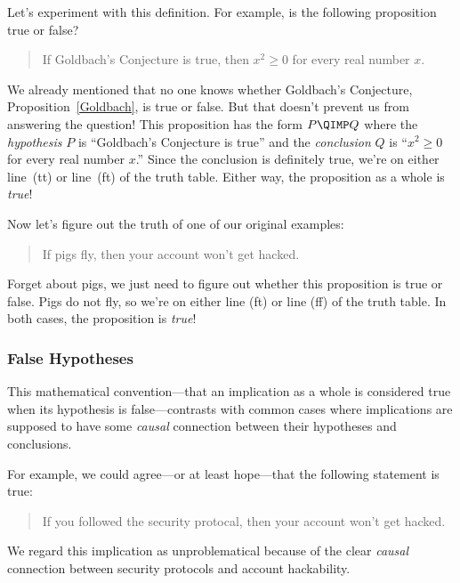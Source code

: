 Let's experiment with this definition.  For example, is the following
proposition true or false?
\begin{quote}
  If Goldbach's Conjecture is true, then $x^2 \geq 0$ for every real
  number $x$.
\end{quote}
We already mentioned that no one knows whether Goldbach's Conjecture,
Proposition~\ref{Goldbach}, is true or false.  But that doesn't
prevent us from answering the question!  This proposition has the form
$P \QIMP Q$ where the \emph{hypothesis} $P$ is ``Goldbach's Conjecture
is true'' and the \emph{conclusion} $Q$ is ``$x^2 \geq 0$ for every
real number $x$.''  Since the conclusion is definitely true, we're on
either line~(tt) or line~(ft) of the truth table.  Either way, the
proposition as a whole is \textit{true}!

Now let's figure out the truth of one of our original examples:
\begin{quote}
  If pigs fly, then your account won't get hacked.
\end{quote}
Forget about pigs, we just need to figure out whether this proposition
is true or false.  Pigs do not fly, so we're on either line (ft) or
line (ff) of the truth table.  In both cases, the proposition is
\textit{true}!

\iffalse
In contrast, here's an example of a false implication:
\begin{center}
``If the moon shines white, then the moon is made of white cheddar.''
\end{center}
Yes, the moon shines white.  But, no, the moon is not made of white
cheddar cheese.  So we're on line (tf) of the truth table, and the
proposition is false.
\fi

\subsubsection{False Hypotheses}

This mathematical convention---that an implication as a whole is
considered true when its hypothesis is false---contrasts with common
cases where implications are supposed to have some \emph{causal}
connection between their hypotheses and conclusions.

For example, we could agree---or at least hope---that the following
statement is true:
\begin{quote}
  If you followed the security protocal, then your account won't get
  hacked.
\end{quote}
We regard this implication as unproblematical because of the clear
\emph{causal} connection between security protocols and account
hackability.

